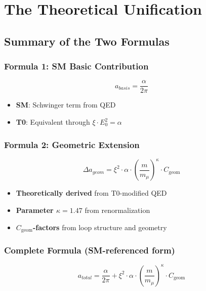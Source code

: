\documentclass[12pt,a4paper]{article}
\numberwithin{equation}{section}
\newcommand{\xipar}{\xi}
\newcommand{\Cgeom}{C_{\text{geom}}}
\newcommand{\kappaT}{\kappa}
\newcommand{\mmu}{m_{\mu}}
\begin{document}
	\section{The Theoretical Unification}
	
	\subsection{Summary of the Two Formulas}
	
	\subsubsection{Formula 1: SM Basic Contribution}
	
	\begin{equation}
		a_{basis} = \frac{\alpha}{2\pi}
	\end{equation}
	
	\begin{itemize}
		\item \textbf{SM}: Schwinger term from QED
		\item \textbf{T0}: Equivalent through $\xipar \cdot E_0^2 = \alpha$
	\end{itemize}
	
	\subsubsection{Formula 2: Geometric Extension}
	
	\begin{equation}
		\Delta a_{geom} = \xipar^2 \cdot \alpha \cdot \left(\frac{m}{\mmu}\right)^\kappaT \cdot \Cgeom
	\end{equation}
	
	\begin{itemize}
		\item \textbf{Theoretically derived} from T0-modified QED
		\item \textbf{Parameter $\kappaT = 1.47$} from renormalization
		\item \textbf{$\Cgeom$-factors} from loop structure and geometry
	\end{itemize}
	
	\subsubsection{Complete Formula (SM-referenced form)}
	
	\begin{equation}
		\boxed{a_{total} = \frac{\alpha}{2\pi} + \xipar^2 \cdot \alpha \cdot \left(\frac{m}{\mmu}\right)^\kappaT \cdot \Cgeom}
	\end{equation}
	
\end{document}

